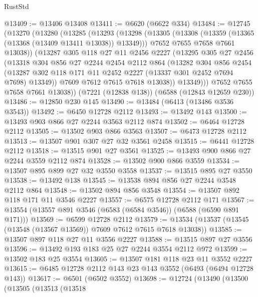 \begin{lexlean}{RustStd}
\begin{coremodule}
@13409 := @13406 @13408
@13411 := @6620 (@6622 @334)
@13484 := @12745
    (@13270
      (@13280
        (@13285
          (@13293
            (@13298
              (@13305
                (@13308 (@13359 (@13365 (@13368 (@13409 @13411 @13038)) @13349)))
                @7652
                @7655
                @7658
                @7661
                @13038))
            (@13287
              @305
              @118
              @27
              @11
              @2456
              @2227
              (@13295
                @305
                @27
                @2456
                (@13318
                  @304
                  @856
                  @27
                  @2244
                  @2454
                  @2112
                  @864
                  (@13282
                    @304
                    @856
                    @2454
                    (@13287 @302 @118 @171 @11 @2452 @2227 (@13337 @301 @2452 @7694 @7698) @13349))
                  @7609
                  @7612
                  @7615
                  @7618
                  @13038))
              @13349)))
        @7652
        @7655
        @7658
        @7661
        @13038))
    (@7221 (@12838 @138))
    (@6588 (@12843 @12659 @230))
@13486 := @12850 @230 @145
@13490 := @13484 (@6413 (@13486 @3536 @3543))
@13492 := @6450 @12728 @2112
@13493 := @13492 @143
@13500 := @13493 @903 @866 @27 @2244 @3563 @2112 @874
@13502 := @6464 @12728 @2112
@13505 := @13502 @903 @866 @3563
@13507 := @6473 @12728 @2112
@13513 := @13507 @901 @307 @27 @32 @3561 @2458
@13515 := @6441 @12728 @2112
@13518 := @13515 @901 @27 @3561
@13525 := @13493 @900 @866 @27 @2244 @3559 @2112 @874
@13528 := @13502 @900 @866 @3559
@13534 := @13507 @895 @899 @27 @32 @3550 @3558
@13537 := @13515 @895 @27 @3550
@13538 := @13492 @138
@13545 := @13538 @894 @856 @27 @2244 @3548 @2112 @864
@13548 := @13502 @894 @856 @3548
@13554 := @13507 @892 @118 @171 @11 @3546 @2227
@13557 := @6575 @12728 @2112 @171
@13567 := @13554 (@13557 @891 @3546 (@6583 (@6584 @3546)) (@6588 (@6590 @891 @171)))
@13569 := @6599 @12728 @2112
@13579 := @13534 (@13537 (@13545 (@13548 (@13567 @13569)) @7609 @7612 @7615 @7618 @13038))
@13585 := @13507 @897 @118 @27 @11 @3556 @2227
@13588 := @13515 @897 @27 @3556
@13596 := @13492 @193 @183 @25 @27 @2244 @3554 @2112 @972
@13599 := @13502 @183 @25 @3554
@13605 := @13507 @181 @118 @23 @11 @3552 @2227
@13615 := @6485 @12728 @2112 @143 @23 @143 @3552 (@6493 (@6494 @12728 @143))
@13617 := @6501 (@6502 @3552)
@13698 := @12724
    (@13490
      (@13500
        (@13505
          (@13513
            (@13518

\end{coremodule}
\end{lexlean}
